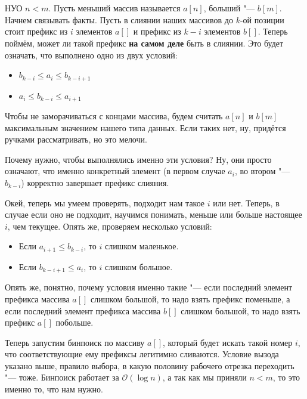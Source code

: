 \section{}
	НУО $n < m$. Пусть меньший массив называется $a[n]$, больший "--- $b[m]$. Начнем связывать факты. Пусть в слиянии наших массивов до $k$-ой позиции стоит префикс из $i$ элементов $a[]$ и префикс из $k - i$ элементов $b[]$. Теперь поймём, может ли такой префикс \textbf{на самом деле} быть в слиянии. Это будет означать, что выполнено одно из двух условий:
	
	\begin{itemize}
		\item $b_{k-i} \le a_i \le b_{k-i+1}$
		\item $a_i \le b_{k-i} \le a_{i+1}$
	\end{itemize}

	Чтобы не заморачиваться с концами массива, будем считать $a[n]$ и $b[m]$ максимальным значением нашего типа данных. Если таких нет, ну, придётся ручками рассматривать, но это мелочи.
	
	Почему нужно, чтобы выполнялись именно эти условия? Ну, они просто означают, что именно конкретный элемент (в первом случае $a_i$, во втором "--- $b_{k-i}$) корректно завершает префикс слияния. 
	
	Окей, теперь мы умеем проверять, подходит нам такое $i$ или нет. Теперь, в случае если оно не подходит, научимся понимать, меньше или больше настоящее $i$, чем текущее. Опять же, проверяем несколько условий:
	
	\begin{itemize}
		\item Если $a_{i+1} \le b_{k-i}$, то $i$ слишком маленькое.
		\item Если $b_{k-i+1} \le a_i$, то $i$ слишком большое.
	\end{itemize}

	Опять же, понятно, почему условия именно такие "--- если последний элемент префикса массива $a[]$ слишком большой, то надо взять префикс поменьше, а если последний элемент префикса массива $b[]$ слишком большой, то надо взять префикс $a[]$ побольше.
	
	Теперь запустим бинпоиск по массиву $a[]$, который будет искать такой номер $i$, что соответствующие ему префиксы легитимно сливаются. Условие вызода указано выше, правило выбора, в какую половину рабочего отрезка переходить "--- тоже. Бинпоиск работает за $\mathcal{O}(\log n)$, а так как мы приняли $n < m$, то это именно то, что нам нужно.
